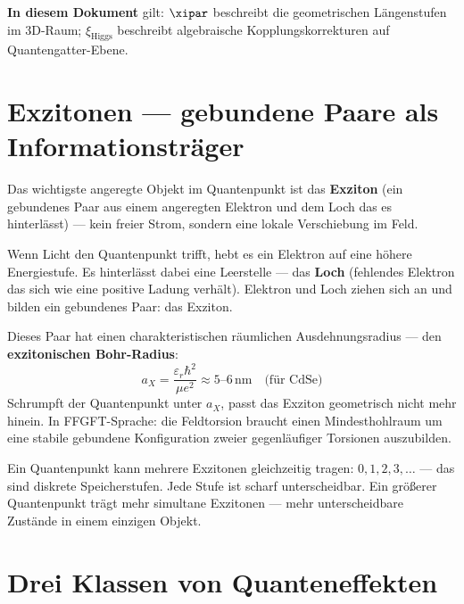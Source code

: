 \begin{foundation}
\begin{keypoint}
\textbf{In diesem Dokument} gilt: $\xipar$ beschreibt die
geometrischen Längenstufen im 3D-Raum;
$\xi_\text{Higgs}$ beschreibt algebraische Kopplungskorrekturen
auf Quantengatter-Ebene.
\end{keypoint}
\end{foundation}

\section{Exzitonen --- gebundene Paare als Informationsträger}
\label{sec:exzitonen}

Das wichtigste angeregte Objekt im Quantenpunkt ist das
\textbf{Exziton} (ein gebundenes Paar aus einem angeregten
Elektron und dem Loch das es hinterlässt) ---
kein freier Strom, sondern eine lokale Verschiebung im Feld.

Wenn Licht den Quantenpunkt trifft, hebt es ein Elektron
auf eine höhere Energiestufe. Es hinterlässt dabei eine
Leerstelle --- das \textbf{Loch} (fehlendes Elektron das sich
wie eine positive Ladung verhält). Elektron und Loch
ziehen sich an und bilden ein gebundenes Paar: das Exziton.

Dieses Paar hat einen charakteristischen räumlichen Ausdehnungsradius
--- den \textbf{exzitonischen Bohr-Radius}:
\begin{equation}
  a_X = \frac{\varepsilon_r \hbar^2}{\mu e^2} \approx 5\text{--}6\,\text{nm}
  \quad \text{(für CdSe)}
\end{equation}
Schrumpft der Quantenpunkt unter $a_X$, passt das Exziton
geometrisch nicht mehr hinein. In FFGFT-Sprache: die Feldtorsion
braucht einen Mindesthohlraum um eine stabile gebundene Konfiguration
zweier gegenläufiger Torsionen auszubilden.

Ein Quantenpunkt kann mehrere Exzitonen gleichzeitig tragen:
$0, 1, 2, 3, \ldots$ --- das sind diskrete Speicherstufen.
Jede Stufe ist scharf unterscheidbar. Ein größerer Quantenpunkt
trägt mehr simultane Exzitonen --- mehr unterscheidbare Zustände
in einem einzigen Objekt.

\section{Drei Klassen von Quanteneffekten}
\label{sec:drei-klassen}

